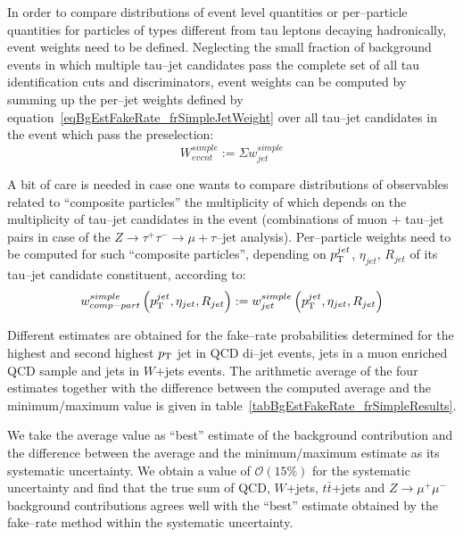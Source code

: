 In order to compare distributions of event level quantities or per--particle
quantities for particles of types different from tau leptons decaying
hadronically, event weights need to be defined.  Neglecting the small fraction
of background events in which multiple tau--jet candidates pass the complete set
of all tau identification cuts and discriminators, event weights can be computed
by summing up the per--jet weights defined by
equation~\ref{eqBgEstFakeRate_frSimpleJetWeight} over all tau--jet candidates in
the event which pass the preselection:
\begin{equation}
W_{event}^{simple} := \Sigma w_{jet}^{simple}
\label{eqBgEstFakeRate_frSimpleEventWeight}
\end{equation}

A bit of care is needed in case one wants to compare distributions of
observables related to ``composite particles'' the multiplicity of which depends
on the multiplicity of tau--jet candidates in the event (\eg combinations of
muon + tau--jet pairs in case of the $Z \rightarrow \tau^{+} \tau^{-}
\rightarrow \mu + \tau\mbox{--jet}$ analysis).  Per--particle weights need to be
computed for such ``composite particles'', depending on $p_{\mathrm{T}}^{jet}$,
$\eta_{jet}$, $R_{jet}$ of its tau--jet candidate constituent, according to:
\begin{equation}
w_{comp-part}^{simple} \left( p_{\mathrm{T}}^{jet}, \eta_{jet}, R_{jet} \right) := 
  w_{jet}^{simple} \left( p_{\mathrm{T}}^{jet}, \eta_{jet}, R_{jet} \right)
\label{eqBgEstFakeRate_frSimpleCompositeParticleWeight}
\end{equation}

Different estimates are obtained for the fake--rate probabilities determined for
the highest and second highest $p_{\mathrm{T}}$ jet in QCD di--jet events, jets in a muon
enriched QCD sample and jets in $W$+jets events.  
The arithmetic average of the
four estimates together with the difference between the computed average and the
minimum/maximum value is given in table~\ref{tabBgEstFakeRate_frSimpleResults}.

We take the average value as ``best'' estimate of the background contribution
and the difference between the average and the minimum/maximum estimate as its
systematic uncertainty.  We obtain a value of $\mathcal{O} \left( 15 \% \right)$
for the systematic uncertainty and find that the true sum of QCD, $W$+jets,
$t\bar{t}$+jets and $Z \rightarrow \mu^{+} \mu^{-}$ background contributions
agrees well with the ``best'' estimate obtained by the fake--rate method within
the systematic uncertainty.

